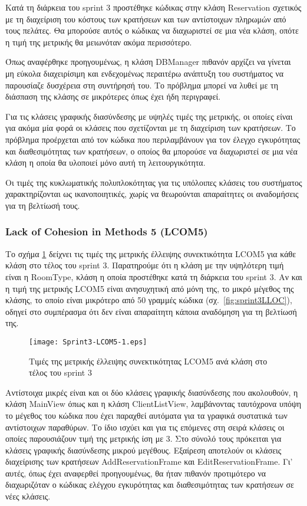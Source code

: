 Κατά τη διάρκεια του sprint 3 προστέθηκε κώδικας στην κλάση Reservation
σχετικός με τη διαχείριση του κόστους των κρατήσεων και των αντίστοιχων
πληρωμών από τους πελάτες. Θα μπορούσε αυτός ο κώδικας να διαχωριστεί σε
μια νέα κλάση, οπότε η τιμή της μετρικής θα μειωνόταν ακόμα περισσότερο.

Όπως αναφέρθηκε προηγουμένως, η κλάση DBManager πιθανόν αρχίζει να
γίνεται μη εύκολα διαχειρίσιμη και ενδεχομένως περαιτέρω ανάπτυξη του
συστήματος να παρουσίαζε δυσχέρεια στη συντήρησή του. Το πρόβλημα μπορεί
να λυθεί με τη διάσπαση της κλάσης σε μικρότερες όπως έχει ήδη
περιγραφεί.

Για τις κλάσεις γραφικής διασύνδεσης με υψηλές τιμές της μετρικής, οι
οποίες είναι για ακόμα μία φορά οι κλάσεις που σχετίζονται με τη
διαχείριση των κρατήσεων. Το πρόβλημα προέρχεται από τον κώδικα που
περιλαμβάνουν για τον έλεγχο εγκυρότητας και διαθεσιμότητας των
κρατήσεων, ο οποίος θα μπορούσε να διαχωριστεί σε μια νέα κλάση η οποία
θα υλοποιεί μόνο αυτή τη λειτουργικότητα.

Οι τιμές της κυκλωματικής πολυπλοκότητας για τις υπόλοιπες κλάσεις του
συστήματος χαρακτηρίζονται ως ικανοποιητικές, χωρίς να θεωρούνται
απαραίτητες οι αναδομήσεις για τη βελτίωσή τους.

\subsubsection{Lack of Cohesion in Methods 5 (LCOM5)}
\label{section:sprint3LCOM5}

Το σχήμα \ref{fig:sprint3LCOM5} δείχνει τις τιμές της μετρικής έλλειψης
συνεκτικότητα LCOM5 για κάθε κλάση στο τέλος του sprint 3. Παρατηρούμε
ότι η κλάση με την υψηλότερη τιμή είναι η RoomType, κλάση η οποία
προστέθηκε κατά τη διάρκεια του sprint 3. Αν και η τιμή της μετρικής
LCOM5 είναι ανησυχητική από μόνη της, το μικρό μέγεθος της κλάσης, το
οποίο είναι μικρότερο από 50 γραμμές κώδικα (σχ.\ \ref{fig:sprint3LLOC}),
οδηγεί στο συμπέρασμα ότι δεν είναι απαραίτητη
κάποια αναδόμηση για τη βελτίωσή της.

\begin{figure}
\centering
\texttt{[image: Sprint3-LCOM5-1.eps]}
\caption{Τιμές της μετρικής έλλειψης συνεκτικότητας LCOM5 ανά κλάση στο τέλος του sprint 3}
\label{fig:sprint3LCOM5}
\end{figure}

Αντίστοιχα μικρές είναι και οι δύο κλάσεις γραφικής διασύνδεσης που
ακολουθούν, η κλάση MainView όπως και η κλάση ClientListView,
λαμβάνοντας ταυτόχρονα υπόψη το μέγεθος του κώδικα που έχει παραχθεί
αυτόματα για τα γραφικά συστατικά των αντίστοιχων παραθύρων. Το ίδιο
ισχύει και για τις επόμενες στη σειρά κλάσεις οι οποίες παρουσιάζουν
τιμή της μετρικής ίση με 3. Στο σύνολό τους πρόκειται για κλάσεις
γραφικής διασύνδεσης μικρού μεγέθους. Εξαίρεση αποτελούν οι κλάσεις
διαχείρισης των κρατήσεων AddReservationFrame και EditReservationFrame.
Γι' αυτές, όπως έχει αναφερθεί προηγουμένως, θα ήταν πιθανόν προτιμότερο
να διαχωριζόταν ο κώδικας ελέγχου εγκυρότητας και διαθεσιμότητας των
κρατήσεων σε νέες κλάσεις.


